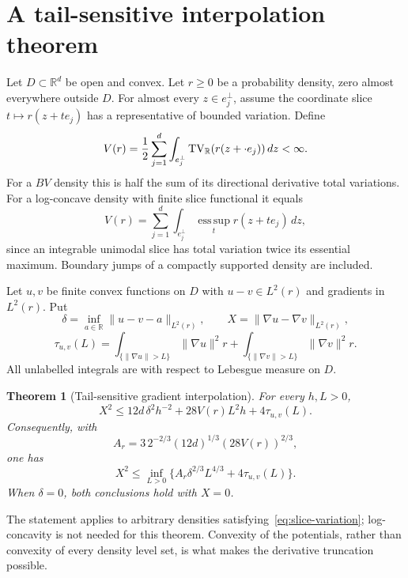 \documentclass[11pt]{article}
\newtheorem{theorem}{Theorem}[section]
\theoremstyle{remark}\newtheorem{remark}[theorem]{Remark}
\newcommand{\R}{\mathbb R}\newcommand{\Var}{\operatorname{Var}}
\newcommand{\norm}[1]{\lVert#1\rVert}\newcommand{\ind}{\mathbf 1}
\begin{document}
\section{A tail-sensitive interpolation theorem}
Let $D\subset\R^d$ be open and convex. Let $r\ge0$ be a probability density, zero almost everywhere outside $D$. For almost every $z\in e_j^\perp$, assume the coordinate slice $t\mapsto r(z+te_j)$ has a representative of bounded variation. Define
\begin{equation}\label{eq:slice-variation}
 V(r)=\frac12\sum_{j=1}^d\int_{e_j^\perp}
                  \TV_{\R}(r(z+\cdot e_j))\,dz<\infty.
\end{equation}
For a $BV$ density this is half the sum of its directional derivative total variations. For a log-concave density with finite slice functional it equals
\begin{equation}\label{eq:logconcave-functional}
 V(r)=\sum_{j=1}^d\int_{e_j^\perp}
                     \operatorname*{ess\,sup}_t r(z+te_j)\,dz,
\end{equation}
since an integrable unimodal slice has total variation twice its essential maximum. Boundary jumps of a compactly supported density are included.

Let $u,v$ be finite convex functions on $D$ with $u-v\in L^2(r)$ and gradients in $L^2(r)$. Put
\[
 \delta=\inf_{a\in\R}\norm{u-v-a}_{L^2(r)},\qquad
 X=\norm{\nabla u-\nabla v}_{L^2(r)},
\]
\[
 \tau_{u,v}(L)=\int_{\{\norm{\nabla u}>L\}}\norm{\nabla u}^2r
             +\int_{\{\norm{\nabla v}>L\}}\norm{\nabla v}^2r.
\]
All unlabelled integrals are with respect to Lebesgue measure on $D$.

\begin{theorem}[Tail-sensitive gradient interpolation]\label{thm:tail}
For every $h,L>0$,
\begin{equation}\label{eq:main-interpolation}
 \boxed{X^2\le12d\,\delta^2h^{-2}+28V(r)L^2h+4\tau_{u,v}(L).}
\end{equation}
Consequently, with
\[
 A_r=3\,2^{-2/3}(12d)^{1/3}(28V(r))^{2/3},
\]
one has
\begin{equation}\label{eq:infimum}
 \boxed{X^2\le\inf_{L>0}\{A_r\delta^{2/3}L^{4/3}+4\tau_{u,v}(L)\}.}
\end{equation}
When $\delta=0$, both conclusions hold with $X=0$.
\end{theorem}

The statement applies to arbitrary densities satisfying~\eqref{eq:slice-variation}; log-concavity is not needed for this theorem. Convexity of the potentials, rather than convexity of every density level set, is what makes the derivative truncation possible.
\end{document}
